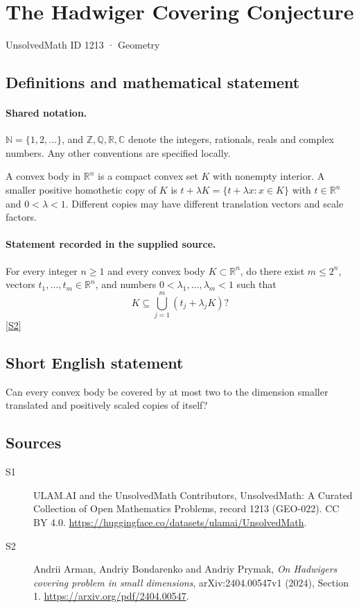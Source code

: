 \documentclass[11pt]{article}
\newcommand{\sref}[2]{\hyperlink{source:#1:#2}{[S#2]}}
\begin{document}
\setcounter{section}{1212}
\section{The Hadwiger Covering Conjecture}\label{1213}
{\small\sffamily UnsolvedMath ID 1213 · Geometry}
\subsection{Definitions and mathematical statement}

\paragraph{Shared notation.}$\mathbb N=\{1,2,\ldots\}$, and $\mathbb Z,\mathbb Q,\mathbb R,\mathbb C$ denote the integers, rationals, reals and complex numbers. Any other conventions are specified locally.


A convex body in $\mathbb R^n$ is a compact convex set $K$ with nonempty interior. A smaller positive homothetic copy of $K$ is $t+\lambda K=\{t+\lambda x:x\in K\}$ with $t\in\mathbb R^n$ and $0<\lambda<1$. Different copies may have different translation vectors and scale factors.
\paragraph{Statement recorded in the supplied source.}
For every integer $n\geq1$ and every convex body $K\subset\mathbb R^n$, do there exist $m\leq2^n$, vectors $t_1,\ldots,t_m\in\mathbb R^n$, and numbers $0<\lambda_1,\ldots,\lambda_m<1$ such that
\[
K\subseteq\bigcup_{j=1}^m(t_j+\lambda_jK)?
\] \sref{1213}{2}

\subsection{Short English statement}
Can every convex body be covered by at most two to the dimension smaller translated and positively scaled copies of itself?
\subsection{Sources}
\begin{description}
\item[\hypertarget{source:1213:1}{S1}] ULAM.AI and the UnsolvedMath Contributors, UnsolvedMath: A Curated Collection of Open Mathematics Problems, record 1213 (GEO-022). CC BY 4.0. \url{https://huggingface.co/datasets/ulamai/UnsolvedMath}.
\item[\hypertarget{source:1213:2}{S2}] Andrii Arman, Andriy Bondarenko and Andriy Prymak, \emph{On Hadwiger\textquotesingle s covering problem in small dimensions}, arXiv:2404.00547v1 (2024), Section 1. \url{https://arxiv.org/pdf/2404.00547}.
\end{description}
\label{end:1213}
\end{document}
